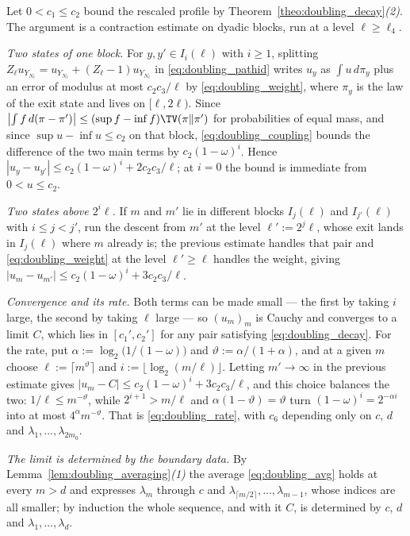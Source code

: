 Let $0<c_1\leq c_2$ bound the rescaled profile by
Theorem~\ref{theo:doubling_decay}\emph{(2)}. The argument is a contraction estimate on dyadic
blocks, run at a level $\ell\geq\ell_4$.

\emph{Two states of one block.} For $y,y'\in I_i(\ell)$ with $i\geq1$, splitting
$Z_\ell u_{Y_{N_\ell}}=u_{Y_{N_\ell}}+(Z_\ell-1)u_{Y_{N_\ell}}$ in \eqref{eq:doubling_pathid}
writes $u_y$ as $\int u\,d\pi_y$ plus an error of modulus at most $c_2c_3/\ell$ by
\eqref{eq:doubling_weight}, where $\pi_y$ is the law of the exit state and lives on
$[\ell,2\ell)$. Since $\bigl|\int f\,d(\pi-\pi')\bigr|\leq(\sup f-\inf f)\TV(\pi\|\pi')$ for
probabilities of equal mass, and since $\sup u-\inf u\leq c_2$ on that block,
\eqref{eq:doubling_coupling} bounds the difference of the two main terms by
$c_2(1-\omega)^{i}$. Hence $|u_y-u_{y'}|\leq c_2(1-\omega)^{i}+2c_2c_3/\ell$; at $i=0$ the
bound is immediate from $0<u\leq c_2$.

\emph{Two states above $2^{i}\ell$.} If $m$ and $m'$ lie in different blocks $I_j(\ell)$ and
$I_{j'}(\ell)$ with $i\leq j<j'$, run the descent from $m'$ at the level $\ell':=2^{j}\ell$,
whose exit lands in $I_j(\ell)$ where $m$ already is; the previous estimate handles that pair
and \eqref{eq:doubling_weight} at the level $\ell'\geq\ell$ handles the weight, giving
$|u_m-u_{m'}|\leq c_2(1-\omega)^{i}+3c_2c_3/\ell$.

\emph{Convergence and its rate.} Both terms can be made small --- the first by taking $i$
large, the second by taking $\ell$ large --- so $(u_m)_m$ is Cauchy and converges to a limit
$C$, which lies in $[c_1',c_2']$ for any pair satisfying \eqref{eq:doubling_decay}. For the
rate, put $\alpha:=\log_2\bigl(1/(1-\omega)\bigr)$ and $\vartheta:=\alpha/(1+\alpha)$, and at a
given $m$ choose $\ell:=\lceil m^{\vartheta}\rceil$ and $i:=\lfloor\log_2(m/\ell)\rfloor$.
Letting $m'\rightarrow\infty$ in the previous estimate gives
$|u_m-C|\leq c_2(1-\omega)^{i}+3c_2c_3/\ell$, and this choice balances the two: $1/\ell\leq
m^{-\vartheta}$, while $2^{i+1}>m/\ell$ and $\alpha(1-\vartheta)=\vartheta$ turn
$(1-\omega)^{i}=2^{-\alpha i}$ into at most $4^{\alpha}m^{-\vartheta}$. That is
\eqref{eq:doubling_rate}, with $c_6$ depending only on $c$, $d$ and
$\lambda_1,\dots,\lambda_{2m_0}$.

\emph{The limit is determined by the boundary data.} By
Lemma~\ref{lem:doubling_averaging}\emph{(1)} the average \eqref{eq:doubling_avg} holds at every
$m>d$ and expresses $\lambda_m$ through $c$ and $\lambda_{\lceil m/2\rceil},\dots,\lambda_{m-1}$,
whose indices are all smaller; by induction the whole sequence, and with it $C$, is determined
by $c$, $d$ and $\lambda_1,\dots,\lambda_d$.
